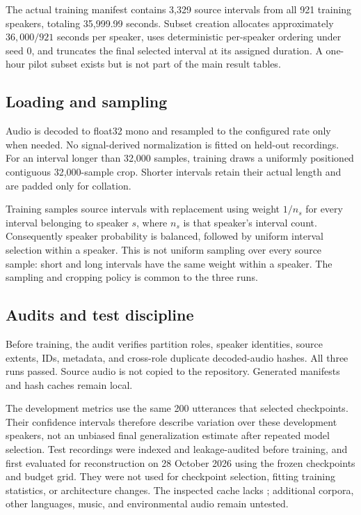 \documentclass[11pt,a4paper]{article}
\newcommand{\code}[1]{\texttt{\small\detokenize{#1}}}
\begin{document}
The actual training manifest contains 3,329 source intervals from all 921 training speakers, totaling 35,999.99 seconds. Subset creation allocates approximately $36{,}000/921$ seconds per speaker, uses deterministic per-speaker ordering under seed 0, and truncates the final selected interval at its assigned duration. A one-hour pilot subset exists but is not part of the main result tables.

\subsection{Loading and sampling}
Audio is decoded to float32 mono and resampled to the configured rate only when needed. No signal-derived normalization is fitted on held-out recordings. For an interval longer than 32,000 samples, training draws a uniformly positioned contiguous 32,000-sample crop. Shorter intervals retain their actual length and are padded only for collation.

Training samples source intervals with replacement using weight $1/n_s$ for every interval belonging to speaker $s$, where $n_s$ is that speaker's interval count. Consequently speaker probability is balanced, followed by uniform interval selection within a speaker. This is not uniform sampling over every source sample: short and long intervals have the same weight within a speaker. The sampling and cropping policy is common to the three runs.

\subsection{Audits and test discipline}
Before training, the audit verifies partition roles, speaker identities, source extents, IDs, metadata, and cross-role duplicate decoded-audio hashes. All three runs passed. Source audio is not copied to the repository. Generated manifests and hash caches remain local.

The development metrics use the same 200 utterances that selected checkpoints. Their confidence intervals therefore describe variation over these development speakers, not an unbiased final generalization estimate after repeated model selection. Test recordings were indexed and leakage-audited before training, and first evaluated for reconstruction on 28 October 2026 using the frozen checkpoints and budget grid. They were not used for checkpoint selection, fitting training statistics, or architecture changes. The inspected cache lacks \code{test-other}; additional corpora, other languages, music, and environmental audio remain untested.
\end{document}
